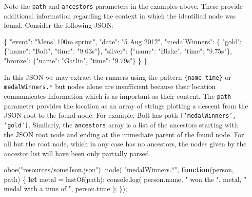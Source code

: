 \documentclass[12pt, ]{article}
\newenvironment{Shaded}{}{}
\newcommand{\KeywordTok}[1]{\textcolor[rgb]{0.00,0.44,0.13}{\textbf{{#1}}}}
\newcommand{\StringTok}[1]{\textcolor[rgb]{0.25,0.44,0.63}{{#1}}}
\newcommand{\OtherTok}[1]{\textcolor[rgb]{0.00,0.44,0.13}{{#1}}}
\newcommand{\FunctionTok}[1]{\textcolor[rgb]{0.02,0.16,0.49}{{#1}}}
\newcommand{\NormalTok}[1]{{#1}}
\begin{document}
Note the \texttt{path} and \texttt{ancestors} parameters in the examples
above. These provide additional information regarding the context in
which the identified node was found. Consider the following JSON:

\begin{Shaded}
\begin{Highlighting}[]
\NormalTok{\{ }
   \StringTok{"event"}\NormalTok{: }\StringTok{"Mens' 100m sprint"}\NormalTok{,}
   \StringTok{"date"}\NormalTok{: }\StringTok{"5 Aug 2012"}\NormalTok{,}
   \StringTok{"medalWinners"}\NormalTok{: \{}
      \StringTok{"gold"}\NormalTok{:     \{}\StringTok{"name"}\NormalTok{: }\StringTok{"Bolt"}\NormalTok{,    }\StringTok{"time"}\NormalTok{: }\StringTok{"9.63s"}\NormalTok{\},}
      \StringTok{"silver"}\NormalTok{:   \{}\StringTok{"name"}\NormalTok{: }\StringTok{"Blake"}\NormalTok{,   }\StringTok{"time"}\NormalTok{: }\StringTok{"9.75s"}\NormalTok{\},}
      \StringTok{"bronze"}\NormalTok{:   \{}\StringTok{"name"}\NormalTok{: }\StringTok{"Gatlin"}\NormalTok{,  }\StringTok{"time"}\NormalTok{: }\StringTok{"9.79s"}\NormalTok{\}}
   \NormalTok{\}}
\NormalTok{\}  }
\end{Highlighting}
\end{Shaded}

In this JSON we may extract the runners using the pattern
\texttt{\{name time\}} or \texttt{medalWinners.*} but nodes alone are
insufficient because their location communicates information which is as
important as their content. The \texttt{path} parameter provides the
location as an array of strings plotting a descent from the JSON root to
the found node. For example, Bolt has path
\texttt{{[}'medalWinners', 'gold'{]}}. Similarly, the \texttt{ancestors}
array is a list of the ancestors starting with the JSON root node and
ending at the immediate parent of the found node. For all but the root
node, which in any case has no ancestors, the nodes given by the
ancestor list will have been only partially parsed.

\begin{Shaded}
\begin{Highlighting}[]
\FunctionTok{oboe}\NormalTok{(}\StringTok{"resources/someJson.json"}\NormalTok{)}
   \NormalTok{.}\FunctionTok{node}\NormalTok{( }\StringTok{"medalWinners.*"}\NormalTok{, }\KeywordTok{function}\NormalTok{(person, path) \{}
      \KeywordTok{let} \NormalTok{metal = }\FunctionTok{lastOf}\NormalTok{(path);}
      \OtherTok{console}\NormalTok{.}\FunctionTok{log}\NormalTok{( }\OtherTok{person}\NormalTok{.}\FunctionTok{name}\NormalTok{, }\StringTok{" won the "}\NormalTok{, metal, }
        \StringTok{" medal with a time of "}\NormalTok{, }\OtherTok{person}\NormalTok{.}\FunctionTok{time} \NormalTok{);}
   \NormalTok{\});}
\end{Highlighting}
\end{Shaded}
\end{document}
